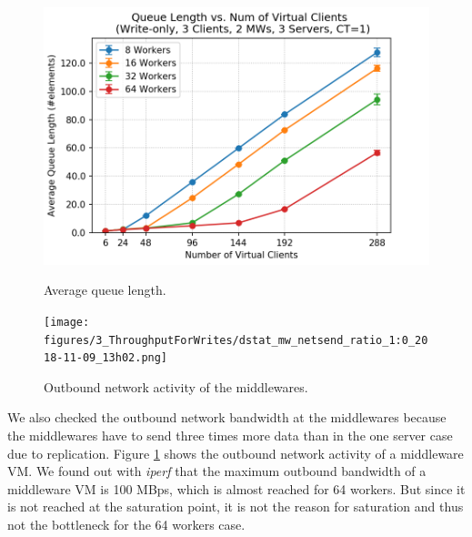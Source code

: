 \begin{figure}[H]
   \begin{minipage}{0.48\textwidth}
        \centering
	    \includegraphics[scale=0.48]{figures/3_ThroughputForWrites/full_write_mw_queuelength_write_2018-11-09_13h02.png}
	    \caption{Average queue length.}
	    \label{queue_length_full_write}
   \end{minipage}\hfill
   \begin{minipage}{0.48\textwidth}
        \centering
	    \texttt{[image: figures/3\_ThroughputForWrites/dstat\_mw\_netsend\_ratio\_1:0\_2018-11-09\_13h02.png]}
	    \caption{Outbound network activity of the middlewares.}
	    \label{outbound_mw_network_acitivity_full_write}
   \end{minipage}
\end{figure}
We also checked the outbound network bandwidth at the middlewares because the middlewares have to send three times more data than in the one server case due to replication. Figure \ref{outbound_mw_network_acitivity_full_write} shows the outbound network activity of a middleware VM. We found out with \textit{iperf} that the maximum outbound bandwidth of a middleware VM is 100 MBps, which is almost reached for 64 workers. But since it is not reached at the saturation point, it is not the reason for saturation and thus not the bottleneck for the 64 workers case. 

